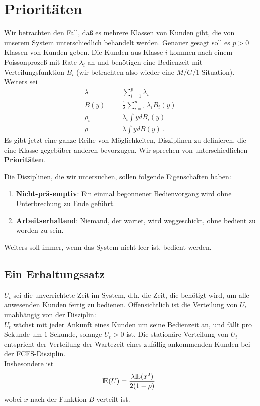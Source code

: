 \chapter{Prioritäten}
Wir betrachten den Fall, daß es mehrere Klassen von Kunden gibt, die von unserem System unterschiedlich behandelt werden. Genauer gesagt soll es
$p > 0$ Klassen
von Kunden geben. Die Kunden aus Klasse $i$ kommen nach einem Poissonprozeß mit Rate $\lambda_{i}$ an und benötigen eine Bedienzeit mit Verteilungsfunktion
$B_{i}$ (wir betrachten also wieder eine $M/G/1$-Situation). Weiters sei
\begin{eqnarray*}
\lambda &=& \sum_{i=1}^{p}\lambda _{i} \\
B(y) &=& \frac{1}{\lambda}\sum_{i=1}^{p}\lambda _{i}B_{i}(y) \\
\rho _{i} &=& \lambda _{i}\int ydB_{i}(y) \\
\rho &=& \lambda \int ydB(y) ~.
\end{eqnarray*}
Es gibt jetzt eine ganze Reihe von Möglichkeiten, Disziplinen zu definieren, die eine Klasse gegebüber anderen bevorzugen. Wir sprechen von unterschiedlichen
{\bf {}Prioritäten}.

Die Disziplinen, die wir untersuchen, sollen folgende Eigenschaften haben:
\begin{enumerate}
\item {\bf Nicht-prä-emptiv}: Ein einmal begonnener Bedienvorgang wird ohne Unterbrechung zu Ende geführt.
\item {\bf Arbeitserhaltend}: Niemand, der wartet, wird weggeschickt, ohne bedient zu worden zu sein.
\end{enumerate}
Weiters soll immer, wenn das System nicht leer ist, bedient werden.

\section{Ein Erhaltungssatz}

$U_{t}$ sei die unverrichtete Zeit im System, d.h. die Zeit, die benötigt wird, um alle anwesenden Kunden fertig zu bedienen. Offensichtlich ist die Verteilung
von $U_{t}$  unabhängig von der Disziplin:  \\
$U_{t}$ wächst mit jeder Ankunft eines Kunden um seine Bedienzeit an, und fällt pro Sekunde um $1$ Sekunde, solange $U_{t}>0$ ist. Die stationäre Verteilung
von $U_{t}$ entspricht der Verteilung der Wartezeit eines zufällig ankommenden Kunden bei der FCFS-Disziplin. \\
Insbesondere ist
\[{\rm I\kern-0.2em E}(U) = \frac{\lambda {\rm I\kern-0.2em E}(x^{2})}{2(1-\rho)} ~  \]
wobei $x$ nach der Funktion $B$ verteilt ist.

